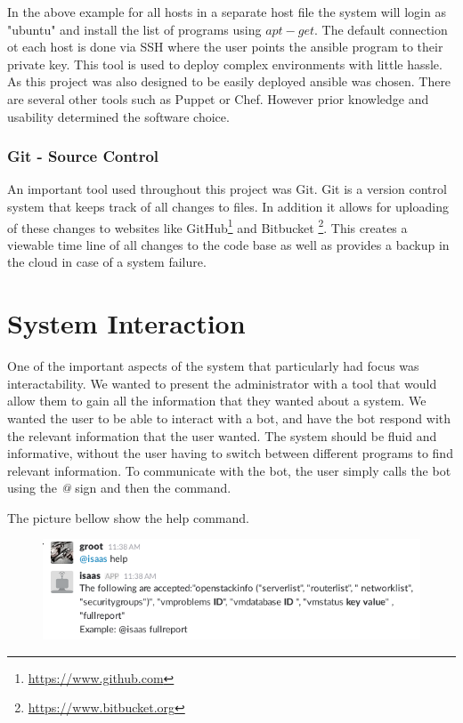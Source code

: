 \documentclass[12pt]{article}
\begin{document}
In the above example for all hosts in a separate host file the system will login as "ubuntu" and install the list of programs using $apt-get$. The default connection ot each host is done via SSH where the user points the ansible program to their private key.  This tool is used to deploy complex environments with little hassle.  As this project was also designed to be easily deployed ansible was chosen. There are several other tools such as Puppet or Chef. However prior knowledge and usability determined the software choice.

\subsubsection{Git - Source Control}
An important tool used throughout this project was Git. Git is a version control system that keeps track of all changes to files. In addition it allows for uploading of these changes to websites like GitHub\footnote{\href{https://www.github.com}{https://www.github.com}} and Bitbucket \footnote{\href{https://www.bitbucket.org}{https://www.bitbucket.org}}. This creates a viewable time line of all changes to the code base as well as provides a backup in the cloud in case of a system failure.

\section{System Interaction}
One of the important aspects of the system that particularly had focus was interactability. We wanted to present the administrator with a tool that would allow them to gain all the information that they wanted about a system. We wanted the user to be able to interact with a bot, and have the bot respond with the relevant information that the user wanted. The system should be fluid and informative, without the user having to switch between different programs to find relevant information. To communicate with the bot, the user simply calls the bot using the \emph{@} sign and then the command.

The picture bellow show the help command.
\begin{figure}[H]
    \begin{mdframed}
    \includegraphics[scale=.5]{./pic/2017-06-26-113851_606x161_scrot.png}
    \end{mdframed}
\end{figure}
\end{document}
